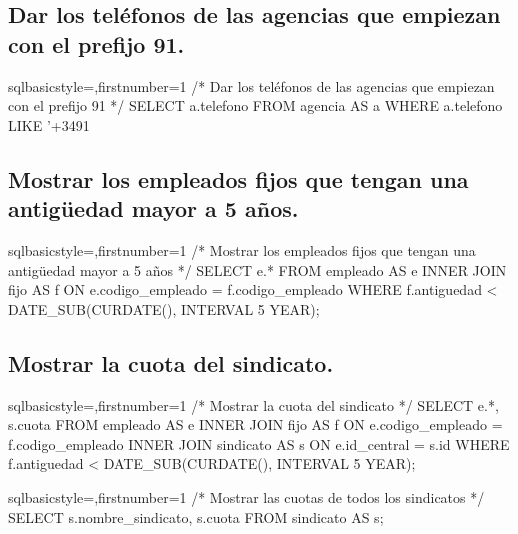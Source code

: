 	\subsection{Dar los teléfonos de las agencias que empiezan con el prefijo 91.}
		\begin{sourcecodep}[]{sql}{basicstyle={\fontsize{10}{10}\selectfont\ttfamily},firstnumber=1}{}
			/* Dar los teléfonos de las agencias que empiezan con el prefijo 91 */
			SELECT a.telefono FROM agencia AS a 
				WHERE a.telefono LIKE '+3491%
	\subsection{Mostrar los empleados fijos que tengan una antigüedad mayor a 5 años.}
		\begin{sourcecodep}[]{sql}{basicstyle={\fontsize{10}{10}\selectfont\ttfamily},firstnumber=1}{}
			/* Mostrar los empleados fijos que tengan una antigüedad mayor a 5 años */
			SELECT e.* FROM empleado AS e
				INNER JOIN fijo AS f ON e.codigo_empleado = f.codigo_empleado 
				WHERE f.antiguedad < DATE_SUB(CURDATE(), INTERVAL 5 YEAR);\end{sourcecodep}
	\subsection{Mostrar la cuota del sindicato.} 
		\begin{sourcecodep}[]{sql}{basicstyle={\fontsize{10}{10}\selectfont\ttfamily},firstnumber=1}{}
			/* Mostrar la cuota del sindicato */
			SELECT e.*, s.cuota FROM empleado AS e
				INNER JOIN fijo AS f ON e.codigo_empleado = f.codigo_empleado 
				INNER JOIN sindicato AS s ON e.id_central = s.id
				WHERE f.antiguedad < DATE_SUB(CURDATE(), INTERVAL 5 YEAR);\end{sourcecodep}
		\begin{sourcecodep}[]{sql}{basicstyle={\fontsize{10}{10}\selectfont\ttfamily},firstnumber=1}{}
			/* Mostrar las cuotas de todos los sindicatos */
			SELECT s.nombre_sindicato, s.cuota FROM sindicato AS s;\end{sourcecodep}

\end{sourcecodep}
